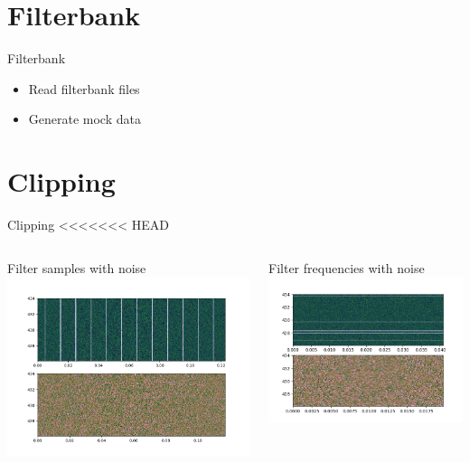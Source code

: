 \documentclass{beamer}
\begin{document}
\section{Filterbank}
\begin{frame}{Filterbank}
	\begin{itemize}
		\item Read filterbank files
		\item Generate mock data
	\end{itemize}
\end{frame}

\section{Clipping}
\begin{frame}{Clipping}
<<<<<<< HEAD
	\begin{columns}
		\begin{column}{0.5\textwidth}
			Filter samples with noise
			\includegraphics[width=\columnwidth]{filter_samples}
		\end{column}
		\begin{column}{0.5\textwidth}
			Filter frequencies with noise
			\includegraphics[width=\columnwidth]{filter_freqs}

\end{column}
\end{columns}
\end{frame}
\end{document}
